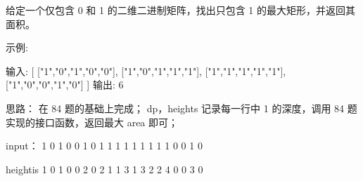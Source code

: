 给定一个仅包含 0 和 1 的二维二进制矩阵，找出只包含 1 的最大矩形，并返回其面积。

示例:

输入:
[
  ["1","0","1","0","0"],
  ["1","0","1","1","1"],
  ["1","1","1","1","1"],
  ["1","0","0","1","0"]
]
输出: 6

































思路：
在 84 题的基础上完成；
dp，heights 记录每一行中 1 的深度，调用 84 题实现的接口函数，返回最大 area 即可；

input：
			1 0 1 0 0
			1 0 1 1 1
			1 1 1 1 1
			1 0 0 1 0

heightis        1 0 1 0 0
			2 0 2 1 1
			3 1 3 2 2
			4 0 0 3 0






























